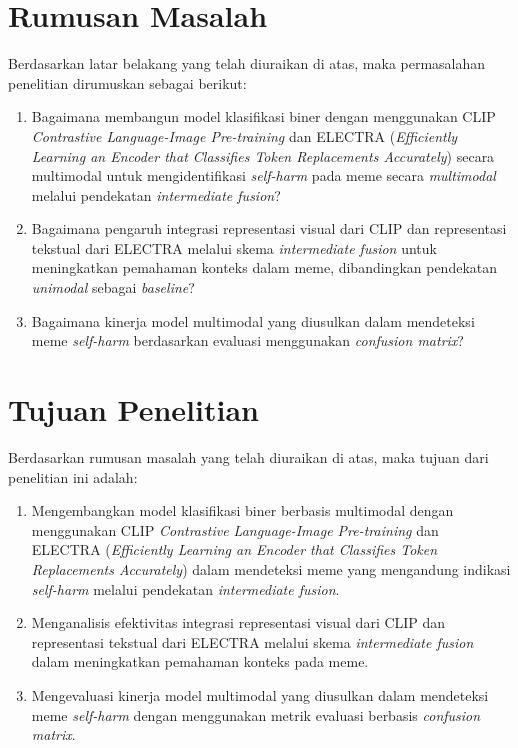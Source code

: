 \section{Rumusan Masalah} \label{I.Rumusan Masalah}

Berdasarkan latar belakang yang telah diuraikan di atas, maka permasalahan penelitian dirumuskan sebagai berikut: \par
\begin{enumerate}
    \item Bagaimana membangun model klasifikasi biner dengan menggunakan CLIP \textit{Contrastive Language-Image Pre-training} dan ELECTRA (\textit{Efficiently Learning an Encoder that Classifies Token Replacements Accurately}) secara multimodal untuk mengidentifikasi \textit{self-harm} pada meme secara \textit{multimodal} melalui pendekatan \textit{intermediate fusion}?
    \item Bagaimana pengaruh integrasi representasi visual dari CLIP dan representasi tekstual dari ELECTRA melalui skema \textit{intermediate fusion} untuk meningkatkan pemahaman konteks dalam meme, dibandingkan pendekatan \textit{unimodal} sebagai \textit{baseline}?
    \item Bagaimana kinerja model multimodal yang diusulkan dalam mendeteksi meme \textit{self-harm} berdasarkan evaluasi menggunakan \textit{confusion matrix}?
\end{enumerate}


\section{Tujuan Penelitian} \label{I.Tujuan}
Berdasarkan rumusan masalah yang telah diuraikan di atas, maka tujuan dari penelitian ini adalah: \par

\begin{enumerate}
    \item Mengembangkan model klasifikasi biner berbasis multimodal dengan menggunakan CLIP \textit{Contrastive Language-Image Pre-training} dan ELECTRA (\textit{Efficiently Learning an Encoder that Classifies Token Replacements Accurately}) dalam mendeteksi meme yang mengandung indikasi \textit{self-harm} melalui pendekatan \textit{intermediate fusion}.
    \item Menganalisis efektivitas integrasi representasi visual dari CLIP dan representasi tekstual dari ELECTRA melalui skema \textit{intermediate fusion} dalam meningkatkan pemahaman konteks pada meme.
    \item Mengevaluasi kinerja model multimodal yang diusulkan dalam mendeteksi meme \textit{self-harm} dengan menggunakan metrik evaluasi berbasis \textit{confusion matrix}.
\end{enumerate}


